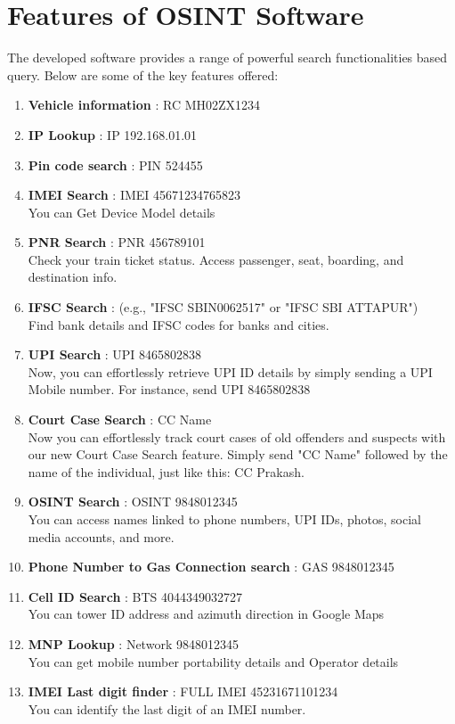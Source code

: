 \section{Features of OSINT Software}

The developed software provides a range of powerful search functionalities based query. Below are some of the key features offered:

\begin{enumerate}[label=\textbf{\roman*.}]
    \item \textbf{Vehicle information} : RC MH02ZX1234
    \item \textbf{IP Lookup} : IP 192.168.01.01
    \item \textbf{Pin code search} : PIN 524455
    \item \textbf{IMEI Search} : IMEI 45671234765823 \\
        You can Get Device Model details
    \item \textbf{PNR Search} : PNR 456789101 \\
        Check your train ticket status. Access passenger, seat, boarding, and destination info.
    \item \textbf{IFSC Search} : (e.g., "IFSC SBIN0062517" or "IFSC SBI ATTAPUR") \\
        Find bank details and IFSC codes for banks and cities.
    \item \textbf{UPI Search} : UPI 8465802838 \\
        Now, you can effortlessly retrieve UPI ID details by simply sending a UPI Mobile number. For instance, send UPI 8465802838
    \item \textbf{Court Case Search} : CC Name \\
        Now you can effortlessly track court cases of old offenders and suspects with our new Court Case Search feature. Simply send "CC Name" followed by the name of the individual, just like this: CC Prakash.
    \item \textbf{OSINT Search} : OSINT 9848012345 \\
        You can access names linked to phone numbers, UPI IDs, photos, social media accounts, and more.
    \item \textbf{Phone Number to Gas Connection search} : GAS 9848012345
    \item \textbf{Cell ID Search} : BTS 4044349032727 \\
        You can tower ID address and azimuth direction in Google Maps
    \item \textbf{MNP Lookup} : Network 9848012345 \\
        You can get mobile number portability details and Operator details
    \item \textbf{IMEI Last digit finder} : FULL IMEI 45231671101234 \\
        You can identify the last digit of an IMEI number.
\end{enumerate}

